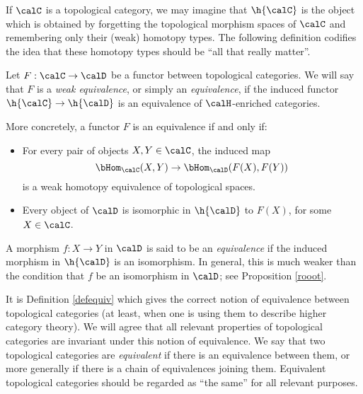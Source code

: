 If $\calC$ is a topological category, we may imagine that $\h{\calC}$ is the object which is obtained by forgetting the topological morphism spaces of $\calC$ and remembering only their (weak) homotopy types. The following definition codifies the idea that these homotopy types should be ``all that really matter''.

\begin{definition}\label{defequiv}
Let $F: \calC \rightarrow \calD$ be a functor between topological categories. We will say that $F$ is a {\it weak equivalence}, or simply an {\it equivalence}, if the induced functor
$\h{ \calC} \rightarrow \h{ \calD}$ is an equivalence of $\calH$-enriched categories.
\end{definition}

More concretely, a functor $F$ is an equivalence if and only if:

\begin{itemize}
\item For every pair of objects $X,Y \in \calC$, the induced map
$$ \bHom_{\calC}(X,Y) \rightarrow \bHom_{\calD}(F(X),F(Y))$$ is a weak homotopy equivalence of topological spaces.

\item Every object of $\calD$ is isomorphic in $\h{ \calD}$ to $F(X)$, for some $X \in \calC$.
\end{itemize}

\begin{remark}
A morphism $f: X \rightarrow Y$ in $\calD$ is said to be an {\it equivalence} if the induced morphism in $\h{ \calD}$ is an isomorphism. In general, this is much weaker than the condition that $f$ be an isomorphism in $\calD$; see Proposition \ref{rooot}.
\end{remark}

It is Definition \ref{defequiv} which gives the correct notion of equivalence between topological categories (at least, when one is using them to describe higher category theory). We will agree that all relevant properties of topological categories are invariant under this notion of equivalence. We say that two topological categories are {\it equivalent} if there is an equivalence between them, or more generally if there is a chain of equivalences joining them. Equivalent topological categories should be regarded as ``the same'' for all relevant purposes.

